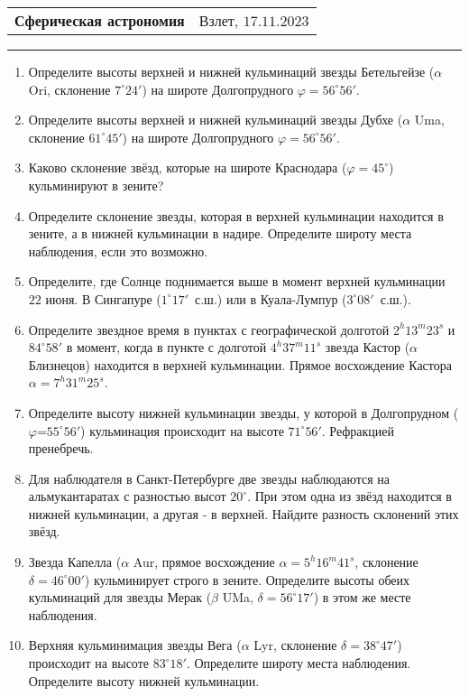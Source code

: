 \documentclass[12pt]{article}
\begin{document}
\begin{tabularx}{\textwidth}{Xr}
{\Large \textbf{Сферическая астрономия}} & Взлет, $17.11.2023$ \\
\end{tabularx}
\noindent\rule{\textwidth}{0.4pt}
\begin{enumerate}
        \item Определите высоты верхней и нижней кульминаций звезды Бетельгейзе ($\alpha$ Ori, склонение $7^{\circ}24'$) на широте Долгопрудного $\varphi=56^{\circ}56'$.
		\item Определите высоты верхней и нижней кульминаций звезды Дубхе ($\alpha$ Uma, склонение $61^{\circ}45'$) на широте Долгопрудного $\varphi=56^{\circ}56'$.
		\item Каково склонение звёзд, которые на широте Краснодара ($\varphi= 45^{\circ}$) кульминируют в зените?
		\item Определите склонение звезды, которая в верхней кульминации находится в зените, а в нижней кульминации в надире. Определите широту места наблюдения, если это возможно.
		\item Определите, где Солнце поднимается выше в момент верхней кульминации $22$ июня. В Сингапуре ($1^{\circ} 17'$~с.ш.) или в Куала-Лумпур ($3^{\circ} 08'$~с.ш.).
		\item Определите звездное время в пунктах с географической долготой $2^h13^m23^s$ и $84^{\circ}58'$ в момент, когда в пункте с долготой $4^h37^m11^s$ звезда Кастор ($\alpha$ Близнецов) находится в верхней кульминации. Прямое восхождение Кастора $\alpha=7^h31^m25^s$.
		\item Определите высоту нижней кульминации звезды, у которой в Долгопрудном ($\varphi$=$55^{\circ}56'$) кульминация происходит на высоте $71^{\circ}56'$. Рефракцией пренебречь.
		\item Для наблюдателя в Санкт-Петербурге две звезды наблюдаются на альмукантаратах с разностью высот $20^{\circ}$. При этом одна из звёзд находится в нижней кульминации, а другая - в верхней. Найдите разность склонений этих звёзд.
		\item Звезда Капелла ($\alpha$ Aur, прямое восхождение $\alpha=5^h 16^m 41^s$, склонение $\delta=46^{\circ}00'$) кульминирует строго в зените. Определите высоты обеих кульминаций для звезды Мерак ($\beta$ UMa, $\delta=56^{\circ}17'$) в этом же месте наблюдения.
		\item Верхняя кульминимация звезды Вега ($\alpha$ Lyr, склонение $\delta=38^{\circ} 47'$) происходит на высоте $83^{\circ}18'$. Определите широту места наблюдения. Определите высоту нижней кульминации.

\end{enumerate}
\end{document}
